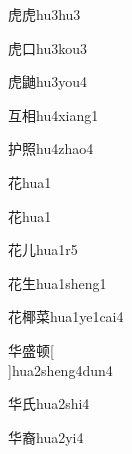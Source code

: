 \begin{verbete}[8;8]{虎虎}{hu3hu3}
\end{verbete}

\begin{verbete}[8;3]{虎口}{hu3kou3}
\end{verbete}

\begin{verbete}[8;18]{虎鼬}{hu3you4}
\end{verbete}

\begin{verbete}[4;9]{互相}{hu4xiang1}
\end{verbete}

\begin{verbete}[7;13]{护照}{hu4zhao4}
\end{verbete}

\begin{verbete}[7]{花}{hua1}
\end{verbete}
\begin{verbete*}[7]{花}{hua1}
\end{verbete*}

\begin{verbete}[7;2]{花儿}{hua1r5}
\end{verbete}

\begin{verbete}[7;5]{花生}{hua1sheng1}
\end{verbete}

\begin{verbete}[7;12;11]{花椰菜}{hua1ye1cai4}
\end{verbete}

\begin{verbete*}[6;11;10]{华盛顿}[\\]{hua2sheng4dun4}
\end{verbete*}

\begin{verbete}[6;4]{华氏}{hua2shi4}
\end{verbete}

\begin{verbete}[6;13]{华裔}{hua2yi4}
\end{verbete}

